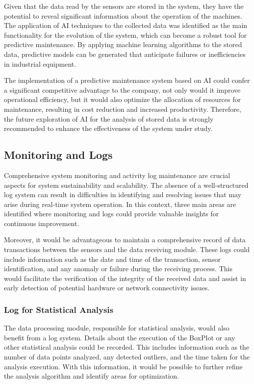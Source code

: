 Given that the data read by the sensors are stored in the system, they have the potential to reveal significant information about the operation of the machines. The application of \gls{AI} techniques to the collected data was identified as the main functionality for the evolution of the system, which can become a robust tool for predictive maintenance. By applying machine learning algorithms to the stored data, predictive models can be generated that anticipate failures or inefficiencies in industrial equipment.

The implementation of a predictive maintenance system based on \gls{AI} could confer a significant competitive advantage to the company, not only would it improve operational efficiency, but it would also optimize the allocation of resources for maintenance, resulting in cost reduction and increased productivity. Therefore, the future exploration of \gls{AI} for the analysis of stored data is strongly recommended to enhance the effectiveness of the system under study.

\subsection{Monitoring and Logs}

Comprehensive system monitoring and activity log maintenance are crucial aspects for system sustainability and scalability. The absence of a well-structured log system can result in difficulties in identifying and resolving issues that may arise during real-time system operation. In this context, three main areas are identified where monitoring and logs could provide valuable insights for continuous improvement.

Moreover, it would be advantageous to maintain a comprehensive record of data transactions between the sensors and the data receiving module. These logs could include information such as the date and time of the transaction, sensor identification, and any anomaly or failure during the receiving process. This would facilitate the verification of the integrity of the received data and assist in early detection of potential hardware or network connectivity issues.

\subsubsection{Log for Statistical Analysis}\label{subsubsec:futurelogs}

The data processing module, responsible for statistical analysis, would also benefit from a log system. Details about the execution of the BoxPlot or any other statistical analysis could be recorded. This includes information such as the number of data points analyzed, any detected outliers, and the time taken for the analysis execution. With this information, it would be possible to further refine the analysis algorithm and identify areas for optimization.

